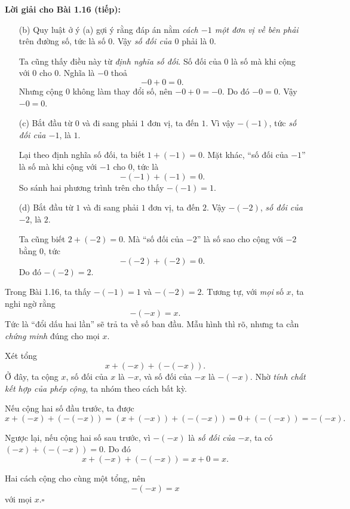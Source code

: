 \begin{problem}[1.16]
\noindent\textbf{Lời giải cho Bài 1.16 (tiếp):}
\begin{enumerate}[label=(\alph*), resume]
  \item[(b)] Quy luật ở ý (a) gợi ý rằng đáp án nằm \emph{cách $-1$ một
  đơn vị về bên phải} trên đường số, tức là số $0$. Vậy \emph{số đối của
  $0$} phải là $0$.

  Ta cũng thấy điều này từ \emph{định nghĩa số đối}. Số đối của $0$ là số
  mà khi cộng với $0$ cho $0$. Nghĩa là $-0$ thoả
  \[
  -0+0=0.
  \]
  Nhưng cộng $0$ không làm thay đổi số, nên $-0+0=-0$. Do đó $-0=0$.
  Vậy \(\boxed{-0=0}\).

  \item[(c)] Bắt đầu từ $0$ và đi sang phải $1$ đơn vị, ta đến $1$.
  Vì vậy \(-(-1)\), tức \emph{số đối của $-1$}, là $1$.

  Lại theo định nghĩa số đối, ta biết $1+(-1)=0$. Mặt khác, “số đối của
  $-1$” là số mà khi cộng với $-1$ cho $0$, tức là
  \[
  -(-1)+(-1)=0.
  \]
  So sánh hai phương trình trên cho thấy \(\boxed{-(-1)=1}\).

  \item[(d)] Bắt đầu từ $1$ và đi sang phải $1$ đơn vị, ta đến $2$.
  Vậy \(-(-2)\), \emph{số đối của $-2$}, là $2$.

  Ta cũng biết $2+(-2)=0$. Mà “số đối của $-2$” là số sao cho cộng với
  $-2$ bằng $0$, tức
  \[
  -(-2)+(-2)=0.
  \]
  Do đó \(\boxed{-(-2)=2}\).
\end{enumerate}

\medskip
Trong Bài 1.16, ta thấy $-(-1)=1$ và $-(-2)=2$. Tương tự, với \emph{mọi} số $x$,
ta nghi ngờ rằng
\[
-(-x)=x.
\]
Tức là “đổi dấu hai lần” sẽ trả ta về số ban đầu. Mẫu hình thì rõ, nhưng
ta cần \emph{chứng minh} đúng cho mọi $x$.

\begin{tcolorbox}[colback=blue!3,colframe=blue!60!black,title={Chứng minh rằng \(-(-x)=x\) với mọi \(x\)}]
Xét tổng
\[
x+(-x)+(-(-x)).
\]
Ở đây, ta cộng $x$, số đối của $x$ là $-x$, và số đối của $-x$ là $-(-x)$.
Nhờ \emph{tính chất kết hợp của phép cộng}, ta nhóm theo cách bất kỳ.

Nếu cộng hai số đầu trước, ta được
\[
x+(-x)+(-(-x))=(x+(-x))+(-(-x))=0+(-(-x))=-(-x).
\]

Ngược lại, nếu cộng hai số sau trước, vì $-(-x)$ là \emph{số đối của $-x$},
ta có $(-x)+(-(-x))=0$. Do đó
\[
x+(-x)+(-(-x))=x+0=x.
\]

Hai cách cộng cho cùng một tổng, nên
\[
-(-x)=x
\]
với mọi $x$.\(\square\)
\end{tcolorbox}

\end{problem}

